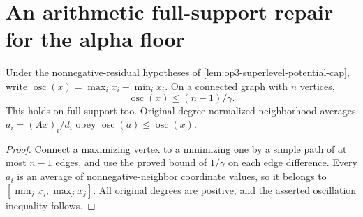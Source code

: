 \section{An arithmetic full-support repair for the alpha floor}
\label{sec:op3-full-support-constant-shift}

\begin{lemma}
\label{lem:op3-global-potential-oscillation}
Under the nonnegative-residual hypotheses of
\cref{lem:op3-superlevel-potential-cap}, write
$\operatorname{osc}(x)=\max_i x_i-\min_i x_i$.
On a connected graph with $n$ vertices,
\[
 \operatorname{osc}(x)\leq(n-1)/\gamma.
\]
This holds on full support too. Original degree-normalized neighborhood
averages $a_i=(Ax)_i/d_i$ obey
$\operatorname{osc}(a)\leq\operatorname{osc}(x)$.
\end{lemma}
\begin{proof}
Connect a maximizing vertex to a minimizing one by a simple path of at
most $n-1$ edges, and use the proved bound of $1/\gamma$ on each edge
difference. Every $a_i$ is an average of nonnegative-neighbor coordinate
values, so it belongs to $[\min_jx_j,\max_jx_j]$. All original degrees
are positive, and the asserted oscillation inequality follows.
\end{proof}

